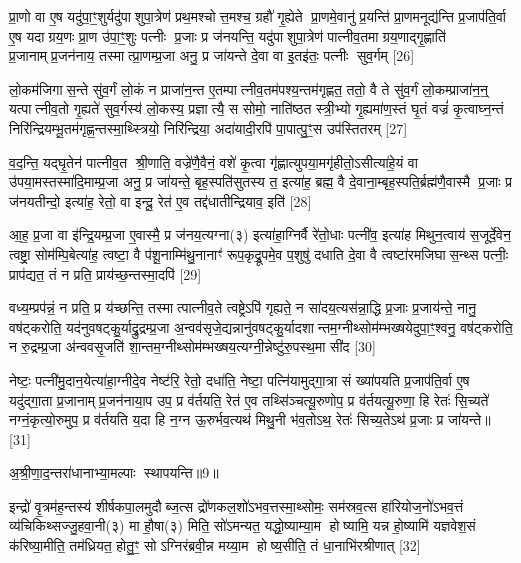 प्रा॒णो वा ए॒ष यदु॑पा॒ꣳ॒शुर्यदु॑पाशुपा॒त्रेण॑ प्रथ॒मश्चोत्त॒मश्च॒ ग्रहौ॑ गृ॒ह्येते प्रा॒णमे॒वानु॑ प्र॒यन्ति॑ प्रा॒णमनूद्य॑न्ति प्र॒जाप॑ति॒र्वा ए॒ष यदाग्रय॒णः प्रा॒ण उ॑पा॒ꣳ॒शुः पत्नीः प्र॒जाः प्र ज॑नयन्ति॒ यदु॑पाशुपा॒त्रेण॑ पात्नीव॒तमाग्रय॒णाद्गृ॒ह्णाति॑ प्र॒जानाम्प्र॒जन॑नाय॒ तस्मात्प्रा॒णम्प्र॒जा अनु॒ प्र जा॑यन्ते दे॒वा वा इ॒तइ॑तः॒ पत्नीः सुव॒र्गम् [26]

लो॒कम॑जिगास॒न्ते सु॑व॒र्गं लो॒कं न प्राजा॑न॒न्त ए॒तम्पात्नीव॒तम॑पश्य॒न्तम॑गृह्णत॒ ततो॒ वै ते सु॑व॒र्गं लो॒कम्प्राजा॑न॒न्॒ यत्पात्नीव॒तो गृ॒ह्यते॑ सुव॒र्गस्य॑ लो॒कस्य॒ प्रज्ञात्यै॒ स सोमो॒ नाति॑ष्ठत स्त्री॒भ्यो गृ॒ह्यमा॑ण॒स्तं घृ॒तं वज्रं॑ कृ॒त्वाघ्न॒न्तं निरि॑न्द्रियम्भू॒तम॑गृह्ण॒न्तस्मा॒थ्स्त्रियो॒ निरि॑न्द्रिया॒ अदा॑यादी॒रपि॑ पा॒पात्पु॒ꣳ॒स उप॑स्तितरम् [27]

व॒द॒न्ति॒ यद्घृ॒तेन॑ पात्नीव॒त श्री॒णाति॒ वज्रे॑णै॒वैनं॒ वशे॑ कृ॒त्वा गृ॑ह्णात्युपया॒मगृ॑हीतो॒ऽसीत्या॑हे॒यं वा उ॑पया॒मस्तस्मा॑दि॒माम्प्र॒जा अनु॒ प्र जा॑यन्ते॒ बृह॒स्पति॑सुतस्य त॒ इत्या॑ह॒ ब्रह्म॒ वै दे॒वाना॒म्बृह॒स्पति॒र्ब्रह्म॑णै॒वास्मै प्र॒जाः प्र ज॑नयतीन्दो॒ इत्या॑ह॒ रेतो॒ वा इन्दू॒ रेत॑ ए॒व तद्द॑धातीन्द्रियाव॒ इति॑ [28]

आ॒ह॒ प्र॒जा वा इ॑न्द्रि॒यम्प्र॒जा ए॒वास्मै॒ प्र ज॑नय॒त्यग्ना(३) इत्या॑हा॒ग्निर्वै रे॑तो॒धाः पत्नी॑व॒ इत्या॑ह मिथुन॒त्वाय॑ स॒जूर्दे॒वेन॒ त्वष्ट्रा॒ सोम॑म्पि॒बेत्या॑ह॒ त्वष्टा॒ वै प॑शू॒नाम्मि॑थु॒नानाꣳ॑ रूप॒कृद्रू॒पमे॒व प॒शुषु॑ दधाति दे॒वा वै त्वष्टा॑रमजिघास॒न्थ्स पत्नीः॒ प्राप॑द्यत॒ तं न प्रति॒ प्राय॑च्छ॒न्तस्मा॒दपि॑ [29]

वध्य॒म्प्रप॑न्नं॒ न प्रति॒ प्र य॑च्छन्ति॒ तस्मात्पात्नीव॒ते त्वष्ट्रेऽपि॑ गृह्यते॒ न सा॑दय॒त्यस॑न्ना॒द्धि प्र॒जाः प्र॒जाय॑न्ते॒ नानु॒ वष॑ट्करोति॒ यद॑नुवषट्कु॒र्याद्रु॒द्रम्प्र॒जा अ॒न्वव॑सृजे॒द्यन्नानु॑वषट्कु॒र्यादशान्तम॒ग्नीथ्सोम॑म्भख्षयेदुपा॒ꣳ॒श्वनु॒ वष॑ट्करोति॒ न रु॒द्रम्प्र॒जा अ॑न्ववसृ॒जति॑ शा॒न्तम॒ग्नीथ्सोम॑म्भख्षय॒त्यग्नी॒न्नेष्टु॑रु॒पस्थ॒मा सी॑द [30]

नेष्टः॒ पत्नी॑मु॒दान॒येत्या॑हा॒ग्नीदे॒व नेष्ट॑रि॒ रेतो॒ दधा॑ति॒ नेष्टा॒ पत्नि॑यामुद्गा॒त्रा सं ख्या॑पयति प्र॒जाप॑ति॒र्वा ए॒ष यदु॑द्गा॒ता प्र॒जानाम्प्र॒जन॑नाया॒प उप॒ प्र व॑र्तयति॒ रेत॑ ए॒व तथ्सि॑ञ्चत्यू॒रुणोप॒ प्र व॑र्तयत्यू॒रुणा॒ हि रेतः॑ सि॒च्यते॑ नग्नं॒कृत्यो॒रुमुप॒ प्र व॑र्तयति य॒दा हि न॒ग्न ऊ॒रुर्भव॒त्यथ॑ मिथु॒नी भ॑व॒तोऽथ॒ रेतः॑ सिच्य॒तेऽथ॑ प्र॒जाः प्र जा॑यन्ते॥ [31]

{\scriptsize {अ॒श्री॒णा॒द॒न्तरा॑धानाभ्या॒मल्पाः स्थापयन्ति॥9॥}}

इन्द्रो॑ वृ॒त्रम॑ह॒न्तस्य॑ शीर्\mbox{}षकपा॒लमुदौब्ज॒त्स द्रो॑णकल॒शो॑ऽभव॒त्तस्मा॒थ्सोमः॒ सम॑स्रव॒त्स हा॑रियोज॒नो॑ऽभव॒त्तं व्य॑चिकिथ्सज्जु॒हवा॒नी(३) मा हौ॒षा(३) मिति॒ सो॑ऽमन्यत॒ यद्धो॒ष्याम्या॒म होष्यामि॒ यन्न हो॒ष्यामि॑ यज्ञवेश॒सं क॑रिष्या॒मीति॒ तम॑ध्रियत॒ होतु॒ꣳ॒ सोऽग्निर॑ब्रवी॒न्न मय्या॒म होष्य॒सीति॒ तं धा॒नाभि॑रश्रीणात् [32]

